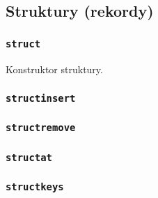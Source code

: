 \subsection{Struktury (rekordy)}
\label{viua_vm_ops_struct}

\subsubsection{\texttt{struct}}

Konstruktor struktury.

\subsubsection{\texttt{structinsert}}
\subsubsection{\texttt{structremove}}
\subsubsection{\texttt{structat}}
\subsubsection{\texttt{structkeys}}
